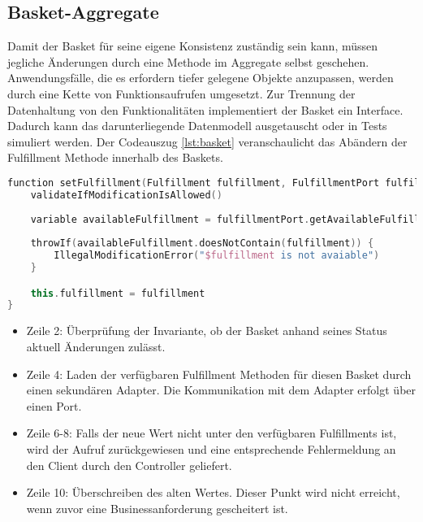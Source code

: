 \pagebreak

\subsection{Basket-Aggregate}

Damit der Basket für seine eigene Konsistenz zuständig sein kann, müssen jegliche Änderungen durch eine Methode im Aggregate selbst geschehen. Anwendungsfälle, die es erfordern tiefer gelegene Objekte anzupassen, werden durch eine Kette von Funktionsaufrufen umgesetzt. Zur Trennung der Datenhaltung von den Funktionalitäten implementiert der Basket ein Interface. Dadurch kann das darunterliegende Datenmodell ausgetauscht oder in Tests simuliert werden. Der Codeauszug \ref{lst:basket} veranschaulicht das Abändern der Fulfillment Methode innerhalb des Baskets.

\vspace{0.5cm}
\begin{minipage}{\linewidth} %
	\begin{lstlisting}[caption={Setzen der Fulfillment Methode im Basket Aggregate}, label={lst:basket}, language=Kotlin]
function setFulfillment(Fulfillment fulfillment, FulfillmentPort fulfillmentPort) {
	validateIfModificationIsAllowed()
	
	variable availableFulfillment = fulfillmentPort.getAvailableFulfillment(outletID)
	
	throwIf(availableFulfillment.doesNotContain(fulfillment)) {
		IllegalModificationError("$fulfillment is not avaiable")
	}

	this.fulfillment = fulfillment
}
	\end{lstlisting}


	\begin{itemize}
		\setlength\itemsep{-1pt}
		\item Zeile 2: Überprüfung der Invariante, ob der Basket anhand seines Status aktuell Änderungen zulässt.
		\item Zeile 4: Laden der verfügbaren Fulfillment Methoden für diesen Basket durch einen sekundären Adapter. Die Kommunikation mit dem Adapter erfolgt über einen Port.
		\item Zeile 6-8: Falls der neue Wert nicht unter den verfügbaren Fulfillments ist, wird der Aufruf zurückgewiesen und eine entsprechende Fehlermeldung an den Client durch den Controller geliefert.
		\item Zeile 10: Überschreiben des alten Wertes. Dieser Punkt wird nicht erreicht, wenn zuvor eine Businessanforderung gescheitert ist.
	\end{itemize}
\end{minipage}

